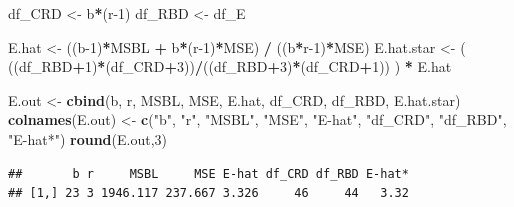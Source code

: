 \documentclass[
]{book}
\newenvironment{Shaded}{\begin{snugshade}}{\end{snugshade}}
\newcommand{\AttributeTok}[1]{\textcolor[rgb]{0.13,0.29,0.53}{#1}}
\newcommand{\ControlFlowTok}[1]{\textcolor[rgb]{0.13,0.29,0.53}{\textbf{#1}}}
\newcommand{\DecValTok}[1]{\textcolor[rgb]{0.00,0.00,0.81}{#1}}
\newcommand{\DocumentationTok}[1]{\textcolor[rgb]{0.56,0.35,0.01}{\textbf{\textit{#1}}}}
\newcommand{\FunctionTok}[1]{\textcolor[rgb]{0.13,0.29,0.53}{\textbf{#1}}}
\newcommand{\NormalTok}[1]{#1}
\newcommand{\OtherTok}[1]{\textcolor[rgb]{0.56,0.35,0.01}{#1}}
\newcommand{\SpecialCharTok}[1]{\textcolor[rgb]{0.81,0.36,0.00}{\textbf{#1}}}
\newcommand{\StringTok}[1]{\textcolor[rgb]{0.31,0.60,0.02}{#1}}
\begin{document}
\begin{Shaded}
\begin{Highlighting}[]
\NormalTok{df\_CRD }\OtherTok{\textless{}{-}}\NormalTok{ b}\SpecialCharTok{*}\NormalTok{(r}\DecValTok{{-}1}\NormalTok{)}
\NormalTok{df\_RBD }\OtherTok{\textless{}{-}}\NormalTok{ df\_E}

\NormalTok{E.hat }\OtherTok{\textless{}{-}}\NormalTok{ ((b}\DecValTok{{-}1}\NormalTok{)}\SpecialCharTok{*}\NormalTok{MSBL }\SpecialCharTok{+}\NormalTok{ b}\SpecialCharTok{*}\NormalTok{(r}\DecValTok{{-}1}\NormalTok{)}\SpecialCharTok{*}\NormalTok{MSE) }\SpecialCharTok{/}\NormalTok{ ((b}\SpecialCharTok{*}\NormalTok{r}\DecValTok{{-}1}\NormalTok{)}\SpecialCharTok{*}\NormalTok{MSE)}
\NormalTok{E.hat.star }\OtherTok{\textless{}{-}}\NormalTok{  ( ((df\_RBD}\SpecialCharTok{+}\DecValTok{1}\NormalTok{)}\SpecialCharTok{*}\NormalTok{(df\_CRD}\SpecialCharTok{+}\DecValTok{3}\NormalTok{))}\SpecialCharTok{/}\NormalTok{((df\_RBD}\SpecialCharTok{+}\DecValTok{3}\NormalTok{)}\SpecialCharTok{*}\NormalTok{(df\_CRD}\SpecialCharTok{+}\DecValTok{1}\NormalTok{)) ) }\SpecialCharTok{*}\NormalTok{ E.hat}

\NormalTok{E.out }\OtherTok{\textless{}{-}} \FunctionTok{cbind}\NormalTok{(b, r, MSBL, MSE, E.hat, df\_CRD, df\_RBD, E.hat.star)}
\FunctionTok{colnames}\NormalTok{(E.out) }\OtherTok{\textless{}{-}} \FunctionTok{c}\NormalTok{(}\StringTok{"b"}\NormalTok{, }\StringTok{"r"}\NormalTok{, }\StringTok{"MSBL"}\NormalTok{, }\StringTok{"MSE"}\NormalTok{, }\StringTok{"E{-}hat"}\NormalTok{, }\StringTok{"df\_CRD"}\NormalTok{, }\StringTok{"df\_RBD"}\NormalTok{, }\StringTok{"E{-}hat*"}\NormalTok{)}
\FunctionTok{round}\NormalTok{(E.out,}\DecValTok{3}\NormalTok{)}
\end{Highlighting}
\end{Shaded}

\begin{verbatim}
##       b r     MSBL     MSE E-hat df_CRD df_RBD E-hat*
## [1,] 23 3 1946.117 237.667 3.326     46     44   3.32
\end{verbatim}

\begin{Shaded}
\end{Shaded}
\end{document}
